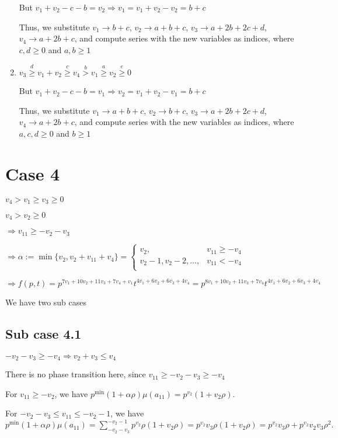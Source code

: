 \documentclass{article}
\begin{document}
\begin{enumerate}
But $v_1+v_2-c-b=v_2\Rightarrow{v_1=v_1+v_2-v_2=b+c}$

Thus, we substitute 
$v_1\rightarrow{b+c}$, 
$v_2\rightarrow{a+b+c}$, 
$v_3\rightarrow{a+2b+2c+d}$, 
$v_4\rightarrow{a+2b+c}$, and compute series with the new variables as indices, where $c,d\geq{0}$ and $a,b\geq{1}$
\item 
$v_3\overset{d}{\geq}v_1+v_2\overset{c}{\geq}v_4\overset{b}{>}{v_1}\overset{a}{\geq}v_2\overset{e}{\geq}{0}$

But $v_1+v_2-c-b=v_1\Rightarrow{v_2=v_1+v_2-v_1=b+c}$

Thus, we substitute 
$v_1\rightarrow{a+b+c}$, 
$v_2\rightarrow{b+c}$, 
$v_3\rightarrow{a+2b+2c+d}$, 
$v_4\rightarrow{a+2b+c}$, and compute series with the new variables as indices, where $a,c,d\geq{0}$ and $b\geq{1}$

\end{enumerate}

\section{Case 4}
$v_4>v_1\geq{v_3}\geq{0}$

$v_4>v_2\geq{0}$

$\Rightarrow{v_{11}}\geq{-v_2-v_3}$

$\Rightarrow\alpha:=\min\{v_2,v_2+v_{11}+v_4\}=\begin{cases}
       v_2, & v_{11}\geq{-v_4}\\
       v_2-1,v_2-2,\dots, & v_{11}<{-v_4}\\
     \end{cases}$

     $\Rightarrow{f(p,t)=p^{7v_1+10v_2+11v_3+7v_4+v_1}t^{4v_1+6v_2+6v_3+4v_4}=p^{8v_1+10v_2+11v_3+7v_4}t^{4v_1+6v_2+6v_3+4v_4}}$

We have two sub cases

\subsection{Sub case 4.1}
$-v_2-v_3\geq{-v_4}\Rightarrow{v_2+v_3\leq{v_4}}$

There is no phase transition here, since $v_{11}\geq{-v_2-v_3}\geq{-v_4}$

For $v_{11}\geq{-v_2}$, we have $p^{\min}(1+\alpha\rho)\mu(a_{11})=p^{v_2}(1+v_2\rho).$

For $-v_2-v_3\leq{v_{11}}\leq{-v_2-1}$, we have $p^{\min}(1+\alpha\rho)\mu(a_{11})=\sum_{-v_2-v_3}^{-v_2-1}p^{v_2}\rho(1+v_2\rho)=p^{v_2}v_3\rho(1+v_2\rho)=p^{v_2}v_3\rho+p^{v_2}v_2v_3\rho^2.$
\end{document}
